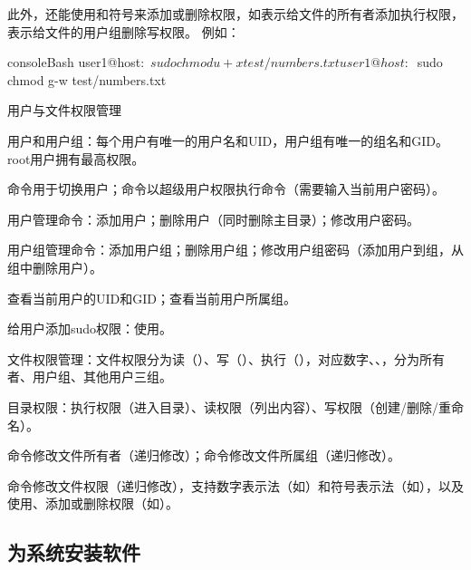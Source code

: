 此外，还能使用\code{+}和\code{-}符号来添加或删除权限，如表示给文件的所有者添加执行权限，表示给文件的用户组删除写权限。
例如：
\begin{envcode}{console}{Bash}
user1@host:~$ sudo chmod u+x test/numbers.txt
user1@host:~$ sudo chmod g-w test/numbers.txt
\end{envcode}

\begin{zj}
用户与文件权限管理

用户和用户组：每个用户有唯一的用户名和UID，用户组有唯一的组名和GID。root用户拥有最高权限。

命令用于切换用户；命令以超级用户权限执行命令（需要输入当前用户密码）。

用户管理命令：添加用户；删除用户（同时删除主目录）；修改用户密码。

用户组管理命令：添加用户组；删除用户组；修改用户组密码（添加用户到组，从组中删除用户）。

查看当前用户的UID和GID；查看当前用户所属组。

给用户添加sudo权限：使用。

文件权限管理：文件权限分为读（）、写（）、执行（），对应数字、、，分为所有者、用户组、其他用户三组。

目录权限：执行权限（进入目录）、读权限（列出内容）、写权限（创建/删除/重命名）。

命令修改文件所有者（递归修改）；命令修改文件所属组（递归修改）。

命令修改文件权限（递归修改），支持数字表示法（如）和符号表示法（如），以及使用\code{+}、\code{-}添加或删除权限（如）。
\end{zj}



\subsection{为系统安装软件}
